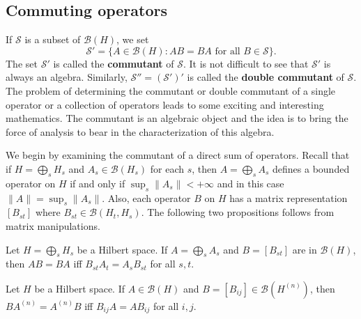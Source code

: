 \subsection{Commuting operators}
If $\mathscr{S}$ is a subset of $\mathcal{B}(H)$, we set
\[\mathscr{S}'=\{A\in\mathcal{B}(H):AB=BA\text{ for all $B\in\mathscr{S}$}\}.\]
The set $\mathcal{S}'$ is called the \textbf{commutant} of $\mathcal{S}$. It is not difficult to see that $\mathcal{S}'$ is always an algebra. Similarly, $\mathcal{S}''=(\mathscr{S}')'$ is called the \textbf{double commutant} of $\mathscr{S}$. The problem of determining the commutant or double commutant of a single operator or a collection of operators leads to some exciting and interesting mathematics. The commutant is an algebraic object and the idea is to bring the force of analysis to bear in the characterization of this algebra.\par
We begin by examining the commutant of a direct sum of operators. Recall that if $H=\bigoplus_sH_s$ and $A_s\in\mathcal{B}(H_s)$ for each $s$, then $A=\bigoplus_sA_s$ defines a bounded operator on $H$ if and only if $\sup_s\|A_s\|<+\infty$ and in this case $\|A\|=\sup_s\|A_s\|$. Also, each operator $B$ on $H$ has a matrix representation $[B_{st}]$ where $B_{st}\in\mathcal{B}(H_t,H_s)$. The following two propositions follows from matrix manipulations.
\begin{proposition}
Let $H=\bigoplus_sH_s$ be a Hilbert space. If $A=\bigoplus_sA_s$ and $B=[B_{st}]$ are in $\mathcal{B}(H)$, then $AB=BA$ iff $B_{st}A_t=A_sB_{st}$ for all $s,t$.
\end{proposition}
\begin{proposition}
Let $H$ be a Hilbert space. If $A\in\mathcal{B}(H)$ and $B=[B_{ij}]\in\mathcal{B}(H^{(n)})$, then $BA^{(n)}=A^{(n)}B$ iff $B_{ij}A=AB_{ij}$ for all $i,j$.
\end{proposition}

